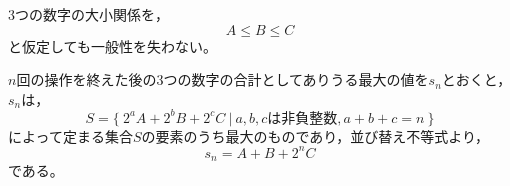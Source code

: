 \documentclass{article}
\begin{document}
3つの数字の大小関係を，
\begin{equation}
\label{abc}
A \leq B \leq C
\end{equation}
と仮定しても一般性を失わない。

$n$回の操作を終えた後の3つの数字の合計としてありうる最大の値を$s_n$とおくと，$s_n$は，
\begin{equation}
S = \{\ 2^a A + 2^b B + 2^c C \ |\ a,b,c \mbox{は非負整数}, a + b + c = n\ \}
\end{equation}
によって定まる集合$S$の要素のうち最大のものであり，並び替え不等式より，
\begin{equation}
s_n = A + B + 2^n C
\end{equation}
である。
\end{document}
